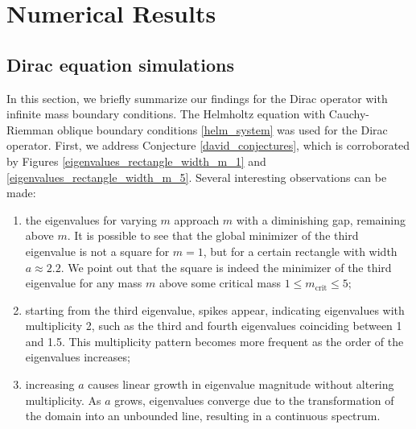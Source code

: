 \documentclass[5p,authoryear]{elsarticle}
\begin{document}
\section{Numerical Results}

\subsection{Dirac equation simulations}

In this section, we briefly summarize our findings for the Dirac operator with infinite mass boundary conditions. The Helmholtz equation with Cauchy-Riemman oblique boundary conditions \eqref{helm_system} was used for the Dirac operator. First, we address Conjecture \ref{david_conjectures}, which is corroborated by Figures \ref{eigenvalues_rectangle_width_m_1} and \ref{eigenvalues_rectangle_width_m_5}. Several
interesting observations can be made:
\begin{enumerate}
    \item \label{dirac_sim_quad_point_1} the eigenvalues for varying \(m\) approach \(m\) with a diminishing gap, remaining above \(m\). It is possible to see that the global minimizer of the third eigenvalue is not a square for \(m=1\), but for a certain rectangle with width \(a \approx 2.2\). We point out that the square is indeed the minimizer of the third eigenvalue for any mass \(m\) above some critical mass \(1 \leq m_{\text{crit}} \leq 5\);

    \item \label{dirac_sim_quad_point_2} starting from the third eigenvalue, spikes appear, indicating eigenvalues with multiplicity 2, such as the third and fourth eigenvalues coinciding between 1 and 1.5. This multiplicity pattern becomes more frequent as the order of the eigenvalues increases;

    \item \label{dirac_sim_quad_point_3} increasing \(a\) causes linear growth in eigenvalue magnitude without altering multiplicity. As \(a\) grows, eigenvalues converge due to the transformation of the domain into an unbounded line, resulting in a continuous spectrum.
\end{enumerate}
\end{document}
